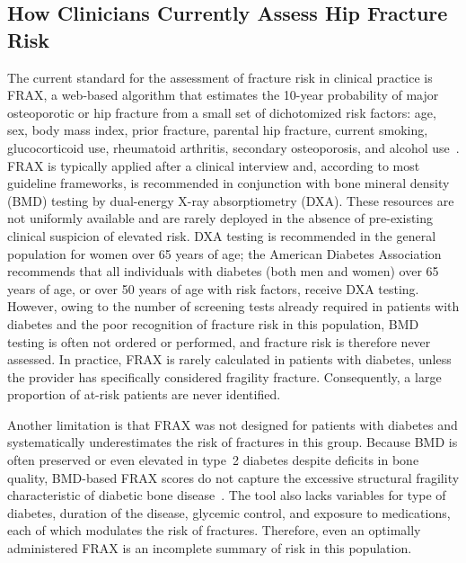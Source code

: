 \documentclass[12pt]{article}
\begin{document}
\subsection{How Clinicians Currently Assess Hip Fracture Risk}

The current standard for the assessment of fracture risk in clinical practice is FRAX, a web-based algorithm that estimates the 10-year probability of major osteoporotic or hip fracture from a small set of dichotomized risk factors: age, sex, body mass index, prior fracture, parental hip fracture, current smoking, glucocorticoid use, rheumatoid arthritis, secondary osteoporosis, and alcohol use~\citep{Kanis2010FRAX}. FRAX is typically applied after a clinical interview and, according to most guideline frameworks, is recommended in conjunction with bone mineral density (BMD) testing by dual-energy X-ray absorptiometry (DXA). These resources are not uniformly available and are rarely deployed in the absence of pre-existing clinical suspicion of elevated risk. DXA testing is recommended in the general population for women over 65 years of age; the American Diabetes Association recommends that all individuals with diabetes (both men and women) over 65 years of age, or over 50 years of age with risk factors, receive DXA testing. However, owing to the number of screening tests already required in patients with diabetes and the poor recognition of fracture risk in this population, BMD testing is often not ordered or performed, and fracture risk is therefore never assessed. In practice, FRAX is rarely calculated in patients with diabetes, unless the provider has specifically considered fragility fracture. Consequently, a large proportion of at-risk patients are never identified.

Another limitation is that FRAX was not designed for patients with diabetes and systematically underestimates the risk of fractures in this group. Because BMD is often preserved or even elevated in type~2 diabetes despite deficits in bone quality, BMD-based FRAX scores do not capture the excessive structural fragility characteristic of diabetic bone disease~\citep{Giangregorio2012JBMR,Beaudoin2019OsteoInt,Jain2025JBMR}. The tool also lacks variables for type of diabetes, duration of the disease, glycemic control, and exposure to medications, each of which modulates the risk of fractures. Therefore, even an optimally administered FRAX is an incomplete summary of risk in this population.
\end{document}
